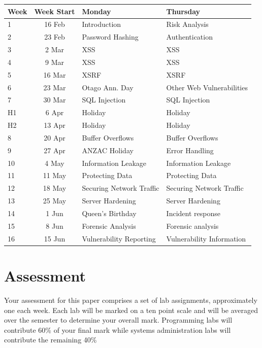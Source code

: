\documentclass{article}
\begin{document}
\renewcommand{\arraystretch}{1.5}
\begin{tabular}{|l|c|l|l|}
\hline
 Week & Week Start & Monday             & Thursday         \\ \hline
 1    & 16 Feb     & Introduction       & Risk Analysis    \\ \hline
 2    & 23 Feb     & Password Hashing   & Authentication   \\ \hline
 3    &  2 Mar     & XSS                & XSS        \\ \hline
 4    &  9 Mar     & XSS                & XSS     \\ \hline
 5    & 16 Mar     & XSRF               & XSRF     \\ \hline
 6    & 23 Mar     & Otago Ann. Day     & Other Web Vulnerabilities       \\ \hline
 7    & 30 Mar     & SQL Injection      & SQL Injection       \\ \hline
 H1   &  6 Apr     & Holiday            & Holiday \\ \hline
 H2   & 13 Apr     & Holiday            & Holiday \\ \hline
 8    & 20 Apr     & Buffer Overflows   & Buffer Overflows        \\ \hline
 9    & 27 Apr     & ANZAC Holiday      & Error Handling         \\ \hline
 10   &  4 May     & Information Leakage & Information Leakage          \\ \hline
 11   & 11 May     & Protecting Data     &  Protecting Data      \\ \hline
 12   & 18 May     & Securing Network Traffic  & Securing Network Traffic      \\ \hline
 13   & 25 May     & Server Hardening   &  Server Hardening      \\ \hline
 14   &  1 Jun     & Queen's Birthday   &  Incident response  \\ \hline
 15   &  8 Jun     & Forensic Analysis  &  Forensic analysis  \\ \hline
 16   & 15 Jun     & Vulnerability Reporting & Vulnerability Information \\ \hline
\end{tabular}

\newpage 

\section*{Assessment}
Your assessment for this paper comprises a set of lab assignments, approximately one each week.  Each lab will be 
marked on a ten point scale and will be averaged over the semester to determine your overall mark.  Programming labs
will contribute 60\% of your final mark while systems administration labs will contribute the remaining 40\%
\end{document}
